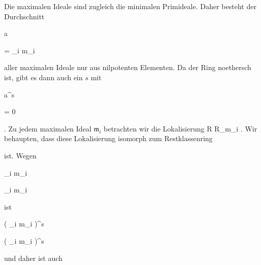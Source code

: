 {


Die maximalen Ideale sind zugleich die minimalen Primideale. Daher besteht der Durchschnitt


\mavergleichskette

{\vergleichskette

{ {\mathfrak a}
}

{ = }{ \bigcap_i {\mathfrak m}_i
}

{  }{
}

{    }{
}

{   }{
}

}
{}{}{}
aller maximalen Ideale nur aus nilpotenten Elementen. Da der Ring noethersch ist, gibt es dann auch ein $s$ mit


\mavergleichskette

{\vergleichskette

{ {\mathfrak a}^s
}

{ = }{ 0
}

{  }{
}

{    }{
}

{   }{
}

}
{}{}{.}
Zu jedem maximalen Ideal ${\mathfrak m}_i$ betrachten wir die Lokalisierung
\maabb {} { R } { R_{{\mathfrak m}_i }
} {.}
Wir behaupten, dass diese Lokalisierung isomorph zum Restklassenring


 {  }


ist. Wegen


\mavergleichskette

{\vergleichskette

{ \prod_i {\mathfrak m}_i
}

{ \subseteq }{ \bigcap_i {\mathfrak m}_i
}

{  }{
}

{    }{
}

{   }{
}

}
{}{}{}
ist


\mavergleichskette

{\vergleichskette

{ \left(  \prod_i {\mathfrak m}_i  \right)^s
}

{ \subseteq }{ \left(  \bigcap_i {\mathfrak m}_i  \right)^s
}

{  }{
}

{    }{
}

{   }{
}

}
{}{}{}
und daher ist auch


\mavergleichskette

}
